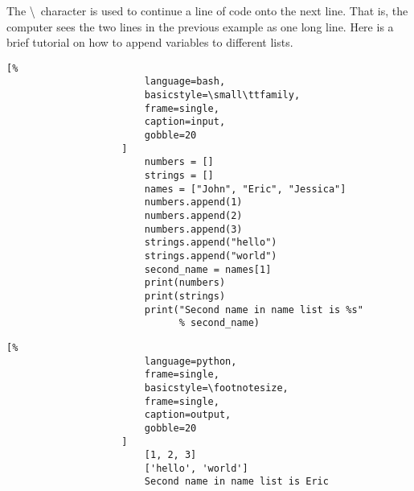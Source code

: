 \documentclass[crop=false,class=book,oneside]{standalone}
\begin{document}
                The \textbackslash\ character is used to continue a line
                of code onto the next line. That is, the computer sees
                the two lines in the previous example as one long line.
                Here is a brief tutorial on how to append variables to
                different lists.\newline
                \begin{minipage}[t]{.48\textwidth}
                    \centering
                    \begin{lstlisting}[%
                        language=bash,
                        basicstyle=\small\ttfamily,
                        frame=single,
                        caption=input,
                        gobble=20
                    ]
                        numbers = []
                        strings = []
                        names = ["John", "Eric", "Jessica"]
                        numbers.append(1)
                        numbers.append(2)
                        numbers.append(3)
                        strings.append("hello")
                        strings.append("world")
                        second_name = names[1]
                        print(numbers)
                        print(strings)
                        print("Second name in name list is %s"
                              % second_name)
                    \end{lstlisting}
                \end{minipage}\hfill
                \begin{minipage}[t]{.48\textwidth}
                    \centering
                    \begin{lstlisting}[%
                        language=python,
                        frame=single,
                        basicstyle=\footnotesize,
                        frame=single,
                        caption=output,
                        gobble=20
                    ]
                        [1, 2, 3]
                        ['hello', 'world']
                        Second name in name list is Eric
                    \end{lstlisting}
                \end{minipage}
                \newpage
\end{document}
